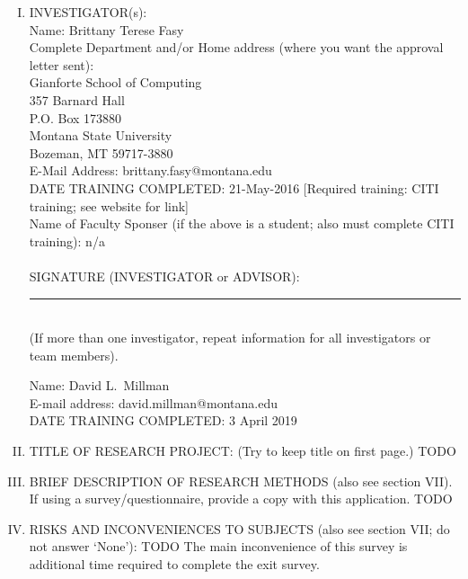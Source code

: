 \documentclass{article}
\newcommand{\response}[1]{{\color{blue}#1}}
\begin{document}
\begin{enumerate}[I.]
    \item INVESTIGATOR(s):\\
        Name: \response{Brittany Terese Fasy}\\
        Complete Department and/or Home address (where you want the approval
        letter sent):\\
            \response{
            Gianforte School of Computing\\
            357 Barnard Hall\\
            P.O. Box 173880\\
            Montana State University\\
            Bozeman, MT 59717-3880}\\
        E-Mail Address: \response{brittany.fasy@montana.edu}\\
        DATE TRAINING COMPLETED: \response{21-May-2016} [Required training: CITI
        training; see website for link]\\
        Name of Faculty Sponser (if the above is a student; also must complete
        CITI training): \response{n/a}
        \\~\\
        SIGNATURE (INVESTIGATOR or ADVISOR):\rule{0.5\linewidth}{\linethickness}   \\

        (If more than one investigator, repeat information for all investigators
        or team members).

        Name: \response{David L.\ Millman}\\
        E-mail address: \response{david.millman@montana.edu}\\
        DATE TRAINING COMPLETED: \response{3 April 2019}\\

    \item TITLE OF RESEARCH PROJECT:  (Try to keep title on first page.)
        \response{TODO}

    \item BRIEF DESCRIPTION OF RESEARCH METHODS (also see section VII).  If
        using a survey/questionnaire,
                  provide a copy with this application.
                  \response{TODO
                  }

    \item RISKS AND INCONVENIENCES TO SUBJECTS (also see section VII; do not
        answer ‘None’): \response{TODO
        The main inconvenience of this survey is additional time required to complete
    the exit survey.}


\end{enumerate}
\end{document}

